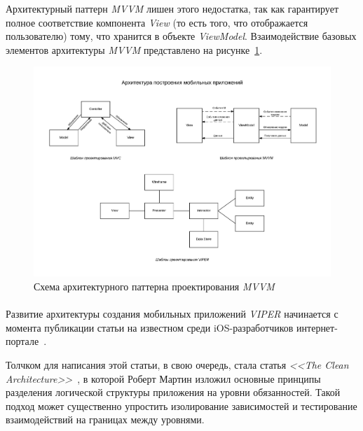 Архитектурный паттерн \textit{MVVM} лишен этого недостатка, так как гарантирует полное
соответствие компонента \textit{View} (то есть того, что отображается пользователю) тому,
что хранится в объекте \textit{ViewModel}.
Взаимодействие базовых элементов архитектуры \textit{MVVM} представлено на рисунке~\ref{fig:mvvm}.
\begin{figure}[h!]
  \centering
  \includegraphics[width=140mm]{fig/mvvm}
  \caption{Схема архитектурного паттерна проектирования \textit{MVVM}}
  \label{fig:mvvm}
\end{figure}

\pagebreak


\paragraph{}

Развитие архитектуры создания мобильных приложений \textit{VIPER} начинается
с момента публикации статьи на известном среди iOS-разработчиков
интернет-портале~\cite{viper_objc_io}.

Толчком для написания этой статьи, в свою очередь,
стала статья \textit{<<The Clean Architecture>>}~\cite{clean_architecture},
в которой Роберт Мартин изложил основные принципы разделения логической
структуры приложения на уровни обязанностей. Такой подход может
существенно упростить изолирование зависимостей и тестирование взаимодействий
на границах между уровнями.

